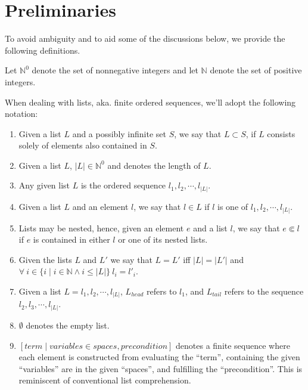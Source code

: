 \section{Preliminaries}

To avoid ambiguity and to aid some of the discussions below, we provide the
following definitions.

\begin{definition} Let $\mathbb{N}^0$ denote the set of nonnegative integers
and let $\mathbb{N}$ denote the set of positive integers.\end{definition}

\begin{definition} When dealing with lists, aka. finite ordered sequences,
we'll adopt the following notation:

\begin{enumerate}

\item Given a list $L$ and a possibly infinite set $S$, we say that $L\subset
S$, if $L$ consists solely of elements also contained in $S$.

\item Given a list $L$, $|L|\in\mathbb{N}^0$ and denotes the length of $L$.

\item Any given list $L$ is the ordered sequence $l_1,l_2,\cdots,l_{|L|}$.

\item Given a list $L$ and an element $l$, we say that $l\in L$ if $l$ is one
of $l_1,l_2,\cdots,l_{|L|}$.

\item Lists may be nested, hence, given an element $e$ and a list $l$, we say
that $e\Subset l$ if $e$ is contained in either $l$ or one of its nested lists.

\item Given the lists $L$ and $L'$ we say that $L=L'$ iff $|L|=|L'|$ and
$\forall\ i\in \{i\mid i\in\mathbb{N} \wedge i \leq |L|\}\ l_i=l'_i$.

\item Given a list $L=l_1,l_2,\cdots,l_{|L|}$, $L_{head}$ refers to $l_1$, and
$L_{tail}$ refers to the sequence $l_2,l_3,\cdots,l_{|L|}$.

\item $\emptyset$ denotes the empty list.

\item $\left[ term \mid variables \in spaces, precondition \right]$ denotes a
finite sequence where each element is constructed from evaluating the ``term'',
containing the given ``variables'' are in the given ``spaces'', and fulfilling
the ``precondition''. This is reminiscent of conventional list comprehension.

\end{enumerate}

\end{definition}

